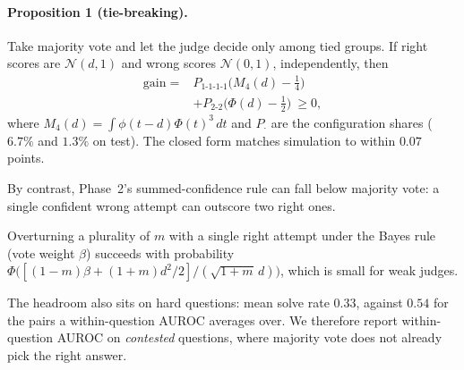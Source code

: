 \paragraph{Proposition 1 (tie-breaking).}
Take majority vote and let the judge decide only among tied groups. If right scores are $\mathcal N(d,1)$ and wrong
scores $\mathcal N(0,1)$, independently, then
\begin{equation}
\begin{split}
\mathrm{gain}={}&P_{1\text{-}1\text{-}1\text{-}1}\Big(M_4(d)-\tfrac14\Big)\\
&+P_{2\text{-}2}\Big(\Phi(d)-\tfrac12\Big)\ \ge 0,
\end{split}
\end{equation}
where $M_4(d)=\int\phi(t-d)\Phi(t)^3\,dt$ and $P_{\cdot}$ are the configuration shares ($6.7\%$ and $1.3\%$ on
test). The closed form matches simulation to within $0.07$ points.

By contrast, Phase~2's summed-confidence rule can fall below majority vote: a single confident wrong attempt can
outscore two right ones.

Overturning a plurality of $m$ with a single right attempt under the Bayes rule (vote weight $\beta$) succeeds with
probability $\Phi\big([(1-m)\beta+(1+m)d^2/2]/(\sqrt{1+m}\,d)\big)$, which is small for weak judges.

The headroom also sits on hard questions: mean solve rate $0.33$, against $0.54$ for the pairs a within-question AUROC
averages over. We therefore report within-question AUROC on \emph{contested} questions, where majority vote does not
already pick the right answer.
